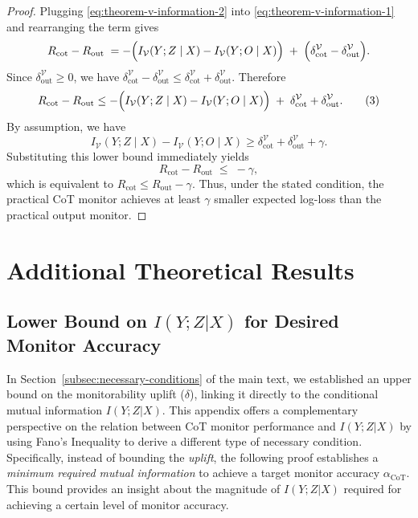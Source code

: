 \documentclass{article}
\theoremstyle{plain}
\begin{document}
\begin{proof}
Plugging \ref{eq:theorem-v-information-2} into \ref{eq:theorem-v-information-1} and rearranging the term gives
\[
R_{\mathrm{cot}}-R_{\mathrm{out}}
\;=-\Bigl(I_{\mathcal{V}}(Y;Z\mid X)-I_{\mathcal{V}}(Y;O\mid X)\Bigr)
\;+\;
\Bigl(\delta^{\mathcal{V}}_{\mathrm{cot}}-\delta^{\mathcal{V}}_{\mathrm{out}}\Bigr).
\]
Since $\delta^{\mathcal{V}}_{\mathrm{out}}\ge 0$, we have
$\delta^{\mathcal{V}}_{\mathrm{cot}}-\delta^{\mathcal{V}}_{\mathrm{out}}
\le \delta^{\mathcal{V}}_{\mathrm{cot}}+\delta^{\mathcal{V}}_{\mathrm{out}}$. Therefore
\[
R_{\mathrm{cot}}-R_{\mathrm{out}}
\le
-\Bigl(I_{\mathcal{V}}(Y;Z\mid X)-I_{\mathcal{V}}(Y;O\mid X)\Bigr)
\;+\;
\delta^{\mathcal{V}}_{\mathrm{cot}}+\delta^{\mathcal{V}}_{\mathrm{out}}.
\tag{3}
\]
By assumption, we have
\[
I_{\mathcal{V}}(Y;Z\mid X)-I_{\mathcal{V}}(Y;O\mid X)
\ge
\delta^{\mathcal{V}}_{\mathrm{cot}}+\delta^{\mathcal{V}}_{\mathrm{out}}+\gamma.
\]
Substituting this lower bound immediately yields
\[
R_{\mathrm{cot}}-R_{\mathrm{out}}
\;\le\;
-\gamma,
\]
which is equivalent to
$R_{\mathrm{cot}}\le R_{\mathrm{out}}-\gamma$. Thus, under the stated condition, the practical CoT monitor achieves at least $\gamma$ smaller expected log-loss than the practical output monitor.
\end{proof}


\color{black}


\section{Additional Theoretical Results}
\subsection{Lower Bound on $I(Y;Z|X)$ for Desired Monitor Accuracy}
In Section~\ref{subsec:necessary-conditions} of the main text, we established an upper bound on the monitorability uplift ($\delta$), linking it directly to the conditional mutual information $I(Y;Z|X)$.
This appendix offers a complementary perspective on the relation between CoT monitor performance and $I(Y;Z|X)$ by using Fano's Inequality to derive a different type of necessary condition.
Specifically, instead of bounding the \emph{uplift}, the following proof establishes a \emph{minimum required mutual information} to achieve a target monitor accuracy $\alpha_\text{CoT}$. 
This bound provides an insight about the magnitude of $I(Y;Z|X)$ required for achieving a certain level of monitor accuracy.
\end{document}
